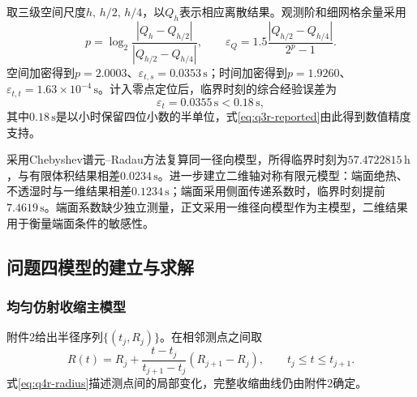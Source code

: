取三级空间尺度$h,\,h/2,\,h/4$，以$Q_h$表示相应离散结果。观测阶和细网格余量采用\cite{roache1998}
\begin{equation}
p=\log_2\frac{|Q_h-Q_{h/2}|}{|Q_{h/2}-Q_{h/4}|},
\qquad
\varepsilon_Q=1.5\frac{|Q_{h/2}-Q_{h/4}|}{2^p-1}.
\label{eq:q3r-convergence}
\end{equation}
空间加密得到$p=2.0003$、$\varepsilon_{t,s}=0.0353\,\mathrm s$；时间加密得到$p=1.9260$、$\varepsilon_{t,t}=1.63\times10^{-4}\,\mathrm s$。计入零点定位后，临界时刻的综合经验误差为
\begin{equation}
\varepsilon_t=0.0355\,\mathrm s<0.18\,\mathrm s,
\label{eq:q3r-time-error}
\end{equation}
其中$0.18\,\mathrm s$是以小时保留四位小数的半单位，式\eqref{eq:q3r-reported}由此得到数值精度支持。

采用Chebyshev谱元--Radau方法\cite{trefethen2000,hairer1996}复算同一径向模型，所得临界时刻为$57.4722815\,\mathrm h$，与有限体积结果相差$0.0234\,\mathrm s$。进一步建立二维轴对称有限元模型\cite{hughes1987}：端面绝热、不透湿时与一维结果相差$0.1234\,\mathrm s$；端面采用侧面传递系数时，临界时刻提前$7.4619\,\mathrm s$。端面系数缺少独立测量，正文采用一维径向模型作为主模型，二维结果用于衡量端面条件的敏感性。


\subsection{问题四模型的建立与求解}

\subsubsection{均匀仿射收缩主模型}

附件2给出半径序列$\{(t_j,R_j)\}$。在相邻测点之间取
\begin{equation}
R(t)=R_j+\frac{t-t_j}{t_{j+1}-t_j}(R_{j+1}-R_j),
\qquad t_j\le t\le t_{j+1}.
\label{eq:q4r-radius}
\end{equation}
式\eqref{eq:q4r-radius}描述测点间的局部变化，完整收缩曲线仍由附件2确定。

